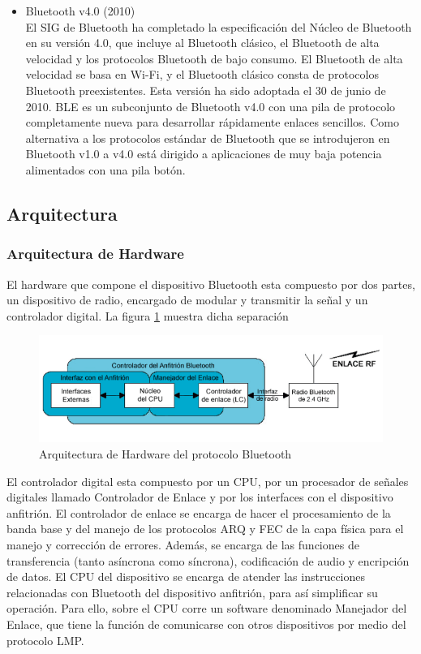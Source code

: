 \begin{itemize}
\item Bluetooth v4.0 (2010)\\
El SIG de Bluetooth ha completado la especificación del Núcleo de Bluetooth en su versión 4.0, que incluye al Bluetooth clásico, el Bluetooth de alta velocidad y los protocolos Bluetooth de bajo consumo. El Bluetooth de alta velocidad se basa en Wi-Fi, y el Bluetooth clásico consta de protocolos Bluetooth preexistentes. Esta versión ha sido adoptada el 30 de junio de 2010. \ac{BLE} es un subconjunto de Bluetooth v4.0 con una pila de protocolo completamente nueva para desarrollar rápidamente enlaces sencillos. Como alternativa a los protocolos estándar de Bluetooth que se introdujeron en Bluetooth v1.0 a v4.0 está dirigido a aplicaciones de muy baja potencia alimentados con una pila botón.

\end{itemize}

\subsection{Arquitectura}

\subsubsection{Arquitectura de Hardware}
El hardware que compone el dispositivo Bluetooth esta compuesto por dos partes, un dispositivo de radio, encargado de modular y transmitir la señal y un controlador digital. La figura \ref{figure:bluetoothhw}  muestra dicha separación

\begin{figure}[h] \centering
	\includegraphics[width=15cm]{graphs/bluetooth_hardware.png}
	\caption{Arquitectura de Hardware del protocolo Bluetooth \cite{codificacion}}
	\label{figure:bluetoothhw} 
\end{figure}

El controlador digital esta compuesto por un CPU, por un procesador de señales digitales llamado Controlador de Enlace y por los interfaces con el dispositivo anfitrión. El controlador de enlace se encarga de hacer el procesamiento de la banda base y del manejo de los protocolos ARQ y FEC de la capa física para el manejo y corrección de errores. Además, se encarga de las funciones de transferencia (tanto asíncrona como síncrona), codificación de audio y encripción de datos. El CPU del dispositivo se encarga de atender las instrucciones relacionadas con Bluetooth del dispositivo anfitrión, para así simplificar su operación. Para ello, sobre el CPU corre un software denominado Manejador del Enlace, que tiene la función de comunicarse con otros dispositivos por medio del protocolo LMP.

